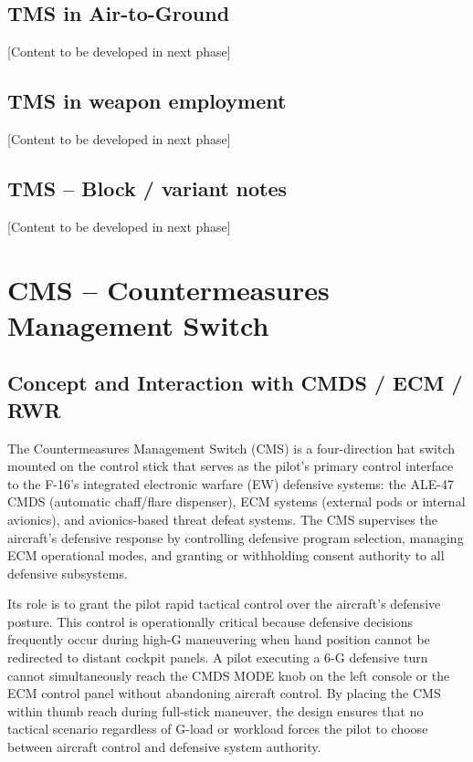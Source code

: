 \documentclass[11pt, a4paper, twoside]{report}
\begin{document}
\section{TMS in Air-to-Ground}
\label{sec:C4-S4}

[Content to be developed in next phase]

\section{TMS in weapon employment}
\label{sec:C4-S5}

[Content to be developed in next phase]

\section{TMS -- Block / variant notes}
\label{sec:C4-S6}
[Content to be developed in next phase]
\newpage

\chapter{CMS -- Countermeasures Management Switch}
\label{chap:C5}

\section{Concept and Interaction with CMDS / ECM / RWR}\label{sec:C5-S1}

The Countermeasures Management Switch (CMS) is a four-direction hat switch mounted on the control stick that serves as the pilot's primary control interface to the F-16's integrated electronic warfare (EW) defensive systems: the ALE-47 CMDS (automatic chaff/flare dispenser), ECM systems (external pods or internal avionics), and avionics-based threat defeat systems. The CMS supervises the aircraft's defensive response by controlling defensive program selection, managing ECM operational modes, and granting or withholding consent authority to all defensive subsystems.

Its role is to grant the pilot rapid tactical control over the aircraft's defensive posture. This control is operationally critical because defensive decisions frequently occur during high-G maneuvering when hand position cannot be redirected to distant cockpit panels. A pilot executing a 6-G defensive turn cannot simultaneously reach the CMDS MODE knob on the left console or the ECM control panel without abandoning aircraft control. By placing the CMS within thumb reach during full-stick maneuver, the design ensures that no tactical scenario regardless of G-load or workload forces the pilot to choose between aircraft control and defensive system authority.
\end{document}
